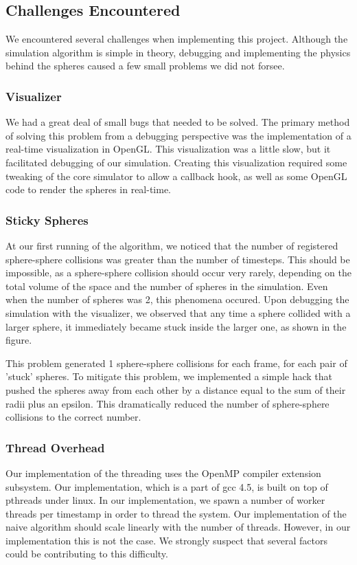 \documentclass[conference]{IEEEtran}
\begin{document}
\subsection{Challenges Encountered}
We encountered several challenges when implementing this project.  Although the simulation algorithm is simple in theory, debugging and implementing the physics behind the spheres caused a few small problems we did not forsee.

\subsubsection{Visualizer}
We had a great deal of small bugs that needed to be solved.  The primary method of solving this problem from a debugging perspective was the implementation of a real-time visualization in OpenGL.
This visualization was a little slow, but it facilitated debugging of our simulation.  Creating this visualization required some tweaking of the core simulator to allow a callback hook, as well as some OpenGL code to render the spheres in real-time.

\subsubsection{Sticky Spheres}
At our first running of the algorithm, we noticed that the number of registered sphere-sphere collisions was greater than the number of timesteps.  This should be impossible, as a sphere-sphere collision should
occur very rarely, depending on the total volume of the space and the number of spheres in the simulation.  Even when the number of spheres was 2, this phenomena occured.  Upon debugging the simulation with the visualizer,
we observed that any time a sphere collided with a larger sphere, it immediately became stuck inside the larger one, as shown in the figure.  


This problem generated 1 sphere-sphere collisions for each frame, for each pair of 'stuck' spheres.  To mitigate this problem, we implemented a simple hack that pushed the spheres away from each other by a distance equal to the sum of their radii plus an epsilon.
This dramatically reduced the number of sphere-sphere collisions to the correct number.

\subsubsection{Thread Overhead}
	Our implementation of the threading uses the OpenMP compiler extension subsystem.  Our implementation, which is a part of gcc 4.5, is built on top of pthreads under linux.  In our implementation, we 
spawn a number of worker threads per timestamp in order to thread the system.  Our implementation of the naive algorithm should scale linearly with the number of threads.  However, in our implementation this is not the case.  We strongly suspect that
several factors could be contributing to this difficulty.  
\end{document}

